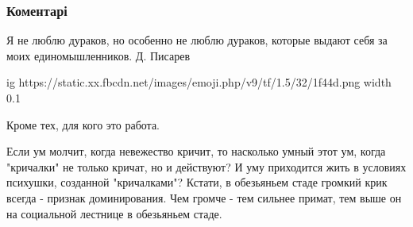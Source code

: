  
 
 
 
 
\subsubsection{Коментарі}
\label{sec:24_08_2021.fb.ermolaev_andrej.1.kopilka_uroki_nezavisimosti.cmt}

\begin{itemize}
 
Я не люблю дураков, но особенно не люблю дураков, которые выдают себя за моих единомышленников. Д. Писарев

 

\ifcmt
  ig https://static.xx.fbcdn.net/images/emoji.php/v9/tf/1.5/32/1f44d.png
  width 0.1
\fi


 
Кроме тех, для кого это работа.

 

Если ум молчит, когда невежество кричит, то насколько умный этот ум, когда
"кричалки" не только кричат, но и действуют? И уму приходится жить в условиях
психушки, созданной "кричалками"? Кстати, в обезьяньем стаде громкий крик
всегда - признак доминирования. Чем громче - тем сильнее примат, тем выше он на
социальной лестнице в обезьяньем стаде.



\end{itemize}
